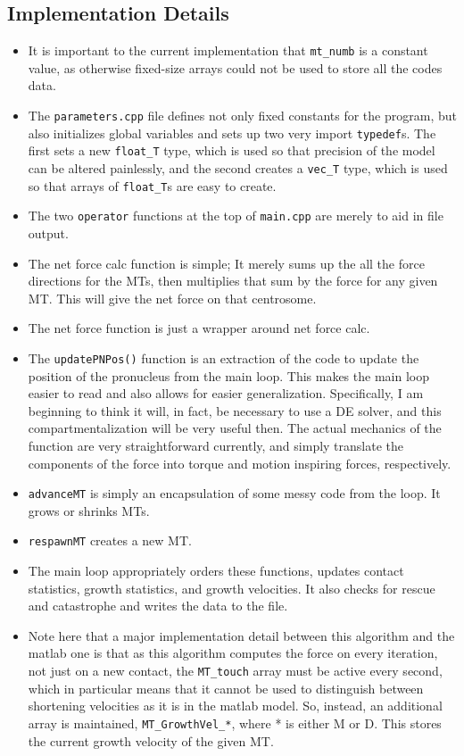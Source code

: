 \documentclass{article}
\begin{document}
\subsection{Implementation Details}
\begin{itemize}
  \item It is important to the current implementation that \texttt{mt\_numb} is
    a constant value, as otherwise fixed-size arrays could not be used to store
    all the codes data. 
  \item The \texttt{parameters.cpp} file defines not only fixed constants for
    the program, but also initializes global variables and sets up two very
    import \texttt{typedef}s. The first sets a new \texttt{float\_T} type, which
    is used so that precision of the model can be altered painlessly, and the
    second creates a \texttt{vec\_T} type, which is used so that arrays of
    \texttt{float\_T}s are easy to create. 
  \item The two \texttt{operator} functions at the top of \texttt{main.cpp} are
    merely to aid in file output. 
  \item The net force calc function is simple; It merely sums up the all the force
    directions for the MTs, then multiplies that sum by the force for any given
    MT. This will give the net force on that centrosome. 
  \item The net force function is just a wrapper around net force calc. 
  \item The \texttt{updatePNPos()} function is an extraction of the code to
    update the position of the pronucleus from the main loop. This makes the
    main loop easier to read and also allows for easier generalization.
    Specifically, I am beginning to think it will, in fact, be necessary to use
    a DE solver, and this compartmentalization will be very useful then. The
    actual mechanics of the function are very straightforward currently, and
    simply translate the components of the force into torque and motion
    inspiring forces, respectively. 
  \item \texttt{advanceMT} is simply an encapsulation of some messy code from
    the loop. It grows or shrinks MTs. 
  \item \texttt{respawnMT} creates a new MT. 
  \item The main loop appropriately orders these functions, updates contact
    statistics, growth statistics, and growth velocities. It also checks for
    rescue and catastrophe and writes the data to the file. 
  \item Note here that a major implementation detail between this algorithm and
    the matlab one is that as this algorithm computes the force on every
    iteration, not just on a new contact, the \texttt{MT\_touch} array must be
    active every second, which in particular means that it cannot be used to
    distinguish between shortening velocities as it is in the matlab model. So,
    instead, an additional array is maintained, \texttt{MT\_GrowthVel\_*}, where
    * is either M or D. This stores the current growth velocity of the given MT. 
\end{itemize}
\end{document}
